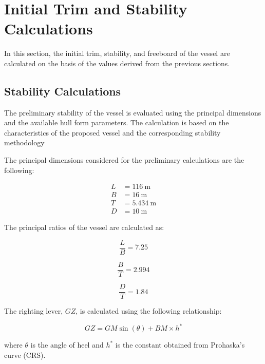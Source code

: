 \documentclass[12pt,a4paper,twoside]{report}
\begin{document}
\section{Initial Trim and Stability Calculations}

In this section, the initial trim, stability, and freeboard of the
vessel are calculated on the basis of the values derived from the previous
sections.

\subsection{Stability Calculations}

The preliminary stability of the vessel is evaluated using the
 principal dimensions and the available hull form parameters. The
calculation is based on the characteristics of the proposed vessel
and the corresponding stability methodology

\vspace{\baselineskip} \par \noindent The principal dimensions considered for the preliminary calculations
are the following:

\[
\begin{aligned}
L &= 116~\mathrm{m} \\
B &= 16~\mathrm{m} \\
T &= 5.434~\mathrm{m} \\
D &= 10~\mathrm{m}
\end{aligned}
\]
\vspace{\baselineskip} \par \noindent The principal ratios of the vessel are calculated as:

\[
\frac{L}{B}=7.25
\]

\[
\frac{B}{T}=2.994
\]

\[
\frac{D}{T}=1.84
\]

\vspace{\baselineskip} \par \noindent The righting lever, $GZ$, is calculated using the following
relationship:

\begin{equation}
GZ = GM\sin(\theta)+BM\times h^*
\end{equation}

\vspace{\baselineskip} \par \noindent where $\theta$ is the angle of heel and $h^*$ is the constant obtained
from Prohaska's curve (CRS).
\end{document}
